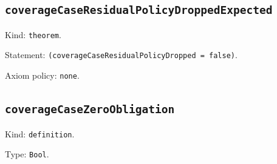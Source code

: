 \documentclass[11pt]{article}
\begin{document}
\subsection*{\texttt{coverageCaseResidualPolicyDroppedExpected}}
\noindent Kind: \texttt{theorem}.\par
\noindent Statement: \texttt{(coverageCaseResidualPolicyDropped = false)}.\par
\noindent Axiom policy: \texttt{none}.\par
\subsection*{\texttt{coverageCaseZeroObligation}}
\noindent Kind: \texttt{definition}.\par
\noindent Type: \texttt{Bool}.\par
\end{document}
